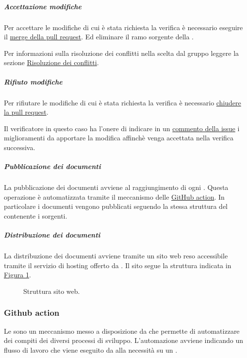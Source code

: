 \subparagraph{Accettazione modifiche}
\label{subpar:accettazione_modifiche}
Per accettare le modifiche di cui è stata richiesta la verifica è necessario eseguire il \hyperref[item:approvazione_pull_request]{merge della pull request}.
Ed eliminare il ramo sorgente della .

Per informazioni sulla risoluzione dei conflitti nella  scelta dal gruppo leggere la sezione \hyperref[subpar:risoluzione_dei_conflitti]{Risoluzione dei conflitti}.


\subparagraph{Rifiuto modifiche}
\label{subpar:rifiuto_modifiche}
Per rifiutare le modifiche di cui è stata richiesta la verifica è necessario \hyperref[item:chiusura_pull_request]{chiudere la pull request}.

Il verificatore in questo caso ha l'onere di indicare in un \hyperref[item:commentare_issue]{commento della issue} i miglioramenti da apportare la modifica affinchè venga accettata nella verifica successiva.

\subparagraph{Pubblicazione dei documenti}
La pubblicazione dei documenti avviene al raggiungimento di ogni .
Questa operazione è automatizzata tramite il meccanismo delle \hyperref[subsubsec:github_action]{GitHub action}.
In particolare i documenti vengono pubblicati seguendo la stessa struttura del  contenente i sorgenti.

\subparagraph{Distribuzione dei documenti}
La distribuzione dei documenti avviene tramite un sito web reso accessibile tramite il servizio di hosting offerto da .
Il sito segue la struttura indicata in \hyperref[fig:sito_docs]{Figura \ref{fig:sito_docs}}.

\begin{figure}[!h]
\caption{Struttura sito web.}
\label{fig:sito_docs}
\end{figure}

\subsubsection{Github action}
\label{subsubsec:github_action}
Le  sono un meccanismo messo a disposizione da  che permette di automatizzare dei compiti dei diversi processi di sviluppo.
L'automazione avviene indicando un flusso di lavoro che viene eseguito da  alla necessità su un .

